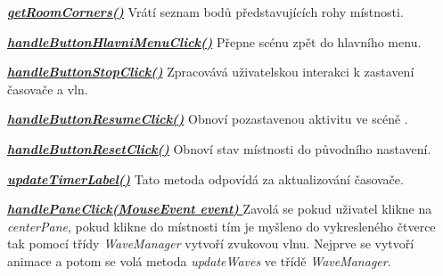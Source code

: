 \vspace{0.3cm}  
\underline{\textbf{\textit{getRoomCorners()}}}  \newline
Vrátí seznam bodů představujících rohy místnosti.

\vspace{0.3cm}  
\underline{\textbf{\textit{handleButtonHlavniMenuClick()}}}  \newline
Přepne scénu zpět do hlavního menu.

\underline{\textbf{\textit{handleButtonStopClick()}}}  \newline
Zpracovává uživatelskou interakci k zastavení časovače a vln.

\vspace{0.3cm}  
\underline{\textbf{\textit{handleButtonResumeClick()}}}  \newline
Obnoví pozastavenou aktivitu ve scéně .

\vspace{0.3cm}  
\underline{\textbf{\textit{handleButtonResetClick()}}}  \newline
Obnoví stav místnosti do původního nastavení.

\vspace{0.3cm}  
\underline{\textbf{\textit{updateTimerLabel()}}}  \newline
Tato metoda odpovídá za aktualizování časovače.

\vspace{0.3cm}  
\underline{\textbf{\textit{handlePaneClick(MouseEvent event) }}}  \newline
Zavolá se pokud uživatel klikne na \textit{centerPane}, pokud klikne do místnosti tím je myšleno do vykresleného čtverce tak pomocí třídy \textit{WaveManager} vytvoří zvukovou vlnu. Nejprve se vytvoří animace a potom se volá metoda \textit{updateWaves}  ve třídě \textit{WaveManager}. 